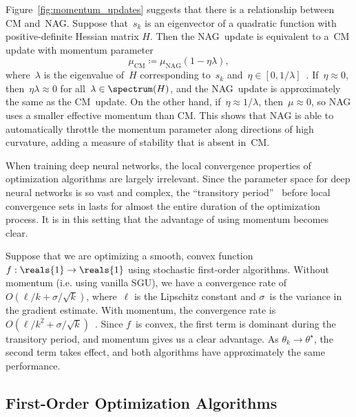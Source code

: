 \documentclass[11pt,a4paper]{article}
\numberwithin{equation}{section}
\begin{document}
Figure~\ref{fig:momentum_updates} suggests that there is a relationship between
CM and~NAG. Suppose that~$s_k$ is an eigenvector of a quadratic function with
positive-definite Hessian matrix $H$. Then the NAG~update is equivalent to a~CM
update with momentum parameter
\[
	\mu_{\text{CM}} \coloneqq \mu_{\text{NAG}} (1 - \eta \lambda),
\]
where~$\lambda$ is the eigenvalue of~$H$ corresponding to~$s_k$ and~$\eta \in
[0, 1 / \lambda]$~\citep{sutskever2013importance}. If~$\eta \approx 0$,
then~$\eta \lambda \approx 0$ for all~$\lambda \in \spectrum(H)$, and the
NAG~update is approximately the same as the CM~update. On the other hand,
if~$\eta \approx 1 / \lambda$, then~$\mu \approx 0$, so NAG uses a smaller
effective momentum than CM. This shows that NAG is able to automatically
throttle the momentum parameter along directions of high curvature, adding a
measure of stability that is absent in~CM.

When training deep neural networks, the local convergence properties of
optimization algorithms are largely irrelevant. Since the parameter space for
deep neural networks is so vast and complex, the ``transitory
period''~\citep{sutskever2013importance} before local convergence sets in lasts
for almost the entire duration of the optimization process. It is in this
setting that the advantage of using momentum becomes clear.

Suppose that we are optimizing a smooth, convex function~$f : \reals{1} \to
\reals{1}$ using stochastic first-order algorithms. Without momentum (i.e. using
vanilla SGU), we have a convergence rate of~$O(\ell / k + \sigma / \sqrt{k})$,
where~$\ell$ is the Lipschitz constant and $\sigma$~is the variance in the
gradient estimate.  With momentum, the convergence rate is~$O(\ell / k^2 +
\sigma / \sqrt{k})$~\citep{sutskever2013importance}. Since $f$~is convex, the
first term is dominant during the transitory period, and momentum gives us a
clear advantage. As $\theta_k \to \theta^\star$, the second term takes effect,
and both algorithms have approximately the same performance.

\subsection{First-Order Optimization Algorithms}
\end{document}
